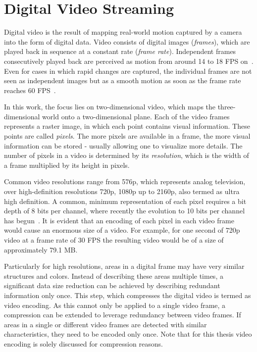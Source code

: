 \section{Digital Video Streaming}
Digital video is the result of mapping real-world motion captured by a camera into the form of digital data.
Video consists of digital images (\emph{frames}), which are played back in sequence at a constant rate (\emph{frame rate}).
Independent frames consecutively played back are perceived as motion from around 14 to 18 \ac{FPS} on~\cite{Kandel2013}. 
Even for cases in which rapid changes are captured, the individual frames are not seen as independent images but as a smooth motion as soon as the frame rate reaches 60 \ac{FPS}~\cite{Kandel2013}.

In this work, the focus lies on two-dimensional video, which maps the three-dimensional world onto a two-dimensional plane.
Each of the video frames represents a raster image, in which each point contains visual information.
These points are called \emph{pixels}. 
The more pixels are available in a frame, the more visual information can be stored - usually allowing one to visualize more details.
The number of pixels in a video is determined by its \emph{resolution}, which is the width of a frame multiplied by its height in pixels.

Common video resolutions range from \ac{576p}, which represents analog television, over high-definition resolutions \ac{720p}, \ac{1080p} up to \ac{2160p}, also termed as ultra high definition.
A common, minimum representation of each pixel requires a bit depth of 8 bits per channel, where recently the evolution to 10 bits per channel has begun~\cite{Sullivan2012}.
It is evident that an encoding of each pixel in each video frame would cause an enormous size of a video.
For example, for one second of \ac{720p} video at a frame rate of 30 \ac{FPS} the resulting video would be of a size of approximately 79.1 \unit{MB}.

Particularly for high resolutions, areas in a digital frame may have very similar structures and colors.
Instead of describing these areas multiple times, a significant data size reduction can be achieved by describing redundant information only once.
This step, which compresses the digital video is termed as video encoding.
As this cannot only be applied to a single video frame, a compression can be extended to leverage redundancy between video frames.
If areas in a single or different video frames are detected with similar characteristics, they need to be encoded only once.
Note that for this thesis video encoding is solely discussed for compression reasons.


